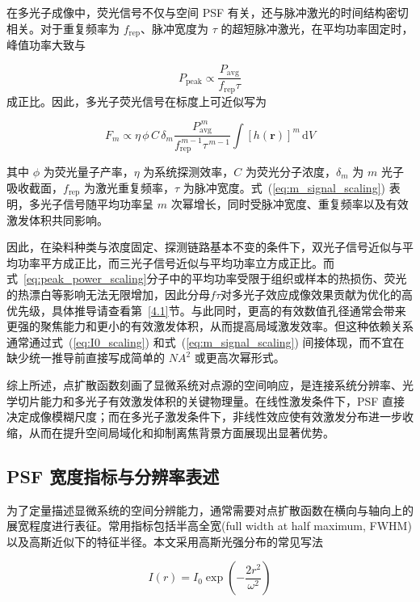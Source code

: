 在多光子成像中，荧光信号不仅与空间 PSF 有关，还与脉冲激光的时间结构密切相关。对于重复频率为 $f_{\mathrm{rep}}$、脉冲宽度为 $\tau$ 的超短脉冲激光，在平均功率固定时，峰值功率大致与

\begin{equation}
  P_{\mathrm{peak}}\propto \frac{P_{\mathrm{avg}}}{f_{\mathrm{rep}}\tau}
  \label{eq:peak_power_scaling}
\end{equation}
成正比。因此，多光子荧光信号在标度上可近似写为

\begin{equation}
  F_m \propto \eta\,\phi\,C\,\delta_m
  \frac{P_{\mathrm{avg}}^{\,m}}{f_{\mathrm{rep}}^{\,m-1}\tau^{\,m-1}}
  \int [h(\mathbf{r})]^m\,\mathrm{d}V
  \label{eq:m_signal_scaling}
\end{equation}

其中 $\phi$ 为荧光量子产率，$\eta$ 为系统探测效率，$C$ 为荧光分子浓度，$\delta_m$ 为 $m$ 光子吸收截面，$f_{\mathrm{rep}}$ 为激光重复频率，$\tau$ 为脉冲宽度。式~(\ref{eq:m_signal_scaling}) 表明，多光子信号随平均功率呈 $m$ 次幂增长，同时受脉冲宽度、重复频率以及有效激发体积共同影响。

因此，在染料种类与浓度固定、探测链路基本不变的条件下，双光子信号近似与平均功率平方成正比，而三光子信号近似与平均功率立方成正比。而式~\ref{eq:peak_power_scaling}分子中的平均功率受限于组织或样本的热损伤、荧光的热漂白等影响无法无限增加，因此分母$f\tau$对多光子效应成像效果贡献为优化的高优先级，具体推导请查看第~\ref{4.1}节。与此同时，更高的有效数值孔径通常会带来更强的聚焦能力和更小的有效激发体积，从而提高局域激发效率。但这种依赖关系通常通过式~(\ref{eq:I0_scaling}) 和式~(\ref{eq:m_signal_scaling}) 间接体现，而不宜在缺少统一推导前直接写成简单的 $NA^2$ 或更高次幂形式。

综上所述，点扩散函数刻画了显微系统对点源的空间响应，是连接系统分辨率、光学切片能力和多光子有效激发体积的关键物理量。在线性激发条件下，PSF 直接决定成像模糊尺度；而在多光子激发条件下，非线性效应使有效激发分布进一步收缩，从而在提升空间局域化和抑制离焦背景方面展现出显著优势。



\subsection{PSF 宽度指标与分辨率表述}\label{2.2.2}
为了定量描述显微系统的空间分辨能力，通常需要对点扩散函数在横向与轴向上的展宽程度进行表征。常用指标包括半高全宽(full width at half maximum, FWHM)以及高斯近似下的特征半径。本文采用高斯光强分布的常见写法

\begin{equation}
  I(r)=I_0\exp\!\left(-\frac{2r^2}{\omega^2}\right)
  \label{eq:gaussian_width_def}
\end{equation}

